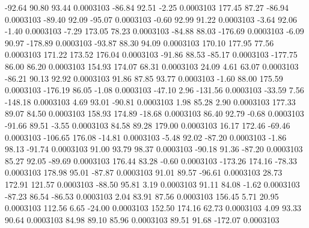       -92.64       90.80       93.44     0.0003103
      -86.84       92.51       -2.25     0.0003103
      177.45       87.27      -86.94     0.0003103
      -89.40       92.09      -95.07     0.0003103
       -0.60       92.99       91.22     0.0003103
       -3.64       92.06       -1.40     0.0003103
       -7.29      173.05       78.23     0.0003103
      -84.88       88.03     -176.69     0.0003103
       -6.09       90.97     -178.89     0.0003103
      -93.87       88.30       94.09     0.0003103
      170.10      177.95       77.56     0.0003103
      171.22      173.52      176.04     0.0003103
      -91.86       88.53      -85.17     0.0003103
     -177.75       86.00       86.20     0.0003103
      154.93      174.07       68.31     0.0003103
       24.09        4.61       63.07     0.0003103
      -86.21       90.13       92.92     0.0003103
       91.86       87.85       93.77     0.0003103
       -1.60       88.00      175.59     0.0003103
     -176.19       86.05       -1.08     0.0003103
      -47.10        2.96     -131.56     0.0003103
      -33.59        7.56     -148.18     0.0003103
        4.69       93.01      -90.81     0.0003103
        1.98       85.28        2.90     0.0003103
      177.33       89.07       84.50     0.0003103
      158.93      174.89      -18.68     0.0003103
       86.40       92.79       -0.68     0.0003103
      -91.66       89.51       -3.55     0.0003103
       84.58       89.28      179.00     0.0003103
       16.17      172.46      -69.46     0.0003103
     -106.65      176.08      -14.81     0.0003103
       -5.48       92.02      -87.20     0.0003103
       -1.86       98.13      -91.74     0.0003103
       91.00       93.79       98.37     0.0003103
      -90.18       91.36      -87.20     0.0003103
       85.27       92.05      -89.69     0.0003103
      176.44       83.28       -0.60     0.0003103
     -173.26      174.16      -78.33     0.0003103
      178.98       95.01      -87.87     0.0003103
       91.01       89.57      -96.61     0.0003103
       28.73      172.91      121.57     0.0003103
      -88.50       95.81        3.19     0.0003103
       91.11       84.08       -1.62     0.0003103
      -87.23       86.54      -86.53     0.0003103
        2.04       83.91       87.56     0.0003103
      156.45        5.71       20.95     0.0003103
      112.56        6.65      -24.00     0.0003103
      152.50      174.16       62.73     0.0003103
        4.09       93.33       90.64     0.0003103
       84.98       89.10       85.96     0.0003103
       89.51       91.68     -172.07     0.0003103

